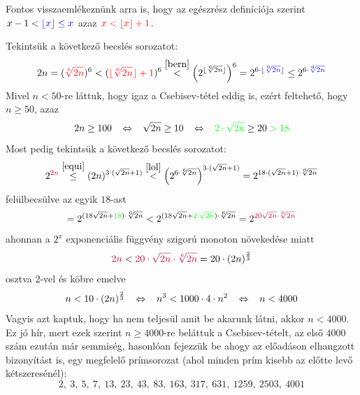 \documentclass[12pt]{book}
\theoremstyle{plain} %
\theoremstyle{definition} %
\theoremstyle{remark}
\numberwithin{equation}{section}  %
\begin{document}
	Fontos visszaemlékeznünk arra is, hogy az egészrész definíciója szerint $x - 1 < \color{blue} \lfloor x \rfloor \leq x \color{black}$ azaz $\color{red} x<\lfloor x \rfloor + 1 \color{black}$.
	
	Tekintsük a következő becslés sorozatot:
	\begin{equation}\label{lol}
		 2n = (\color{red}\sqrt[6]{2n}\color{black})^6 < (\color{red} \lfloor \sqrt[6]{2n} \rfloor + 1 \color{black})^6 \stackrel{\ref{bern}}{<} \left(2^{\lfloor \sqrt[6]{2n} \rfloor}\right)^6 = 2^{6\cdot \color{blue} \lfloor \sqrt[6]{2n} \rfloor \color{black} } \leq 2^{6\cdot \color{blue} \sqrt[6]{2n} \color{black} }
	\end{equation}
	Mivel $n< 50$-re láttuk, hogy igaz a Csebisev-tétel eddig is, ezért feltehető, hogy $n\geq 50$, azaz
	\[ 2n\geq 100 \hspace{3mm} \Leftrightarrow \hspace{3mm} \sqrt{2n} \geq 10 \hspace{3mm} \Leftrightarrow \hspace{3mm} \color{green}2\cdot \sqrt{2n}\color{black} \geq 20 \color{green}> 18\color{black}   \]
	Most pedig tekintsük a következő becslés sorozatot:
	\[ 2^{\color{purple}2n\color{black}} \stackrel{\ref{equi}}{\leq} (2n)^{3\cdot (\sqrt{2n} + 1)} \stackrel{\ref{lol}}{<} \left(2^{6\cdot \sqrt[6]{2n}}\right)^{3\cdot (\sqrt{2n}+1)} = 2^{18 \cdot (\sqrt{2n}+1)\cdot \sqrt[6]{2n}}  \]
	felülbecsülve az egyik $18$-ast
	\[= 2^{(18 \sqrt{2n}+\color{green}18\color{black})\cdot \sqrt[6]{2n}} <  2^{(18\sqrt{2n} + \color{green}2\cdot \sqrt{2n}\color{black})\cdot \sqrt[6]{2n}} = 2^{\color{purple}20\sqrt{2n}\cdot \sqrt[6]{2n}\color{black}}  \]
	ahonnan a $2^x$ exponenciális függvény szigorú monoton növekedése miatt
	\[ \color{purple} 2n \color{black} < \color{purple} 20\cdot \sqrt{2n} \cdot \sqrt[6]{2n} \color{black} = 20\cdot (2n)^{\frac{2}{3}} \]
	osztva $2$-vel és köbre emelve
	\[ n < 10\cdot (2n)^{\frac{2}{3}} \hspace{3mm} \Leftrightarrow \hspace{3mm} n^3 < 1000 \cdot 4 \cdot n^2 \hspace{3mm} \Leftrightarrow \hspace{3mm} n < 4000  \]
	Vagyis azt kaptuk, hogy ha nem teljesül amit be akarunk látni, akkor $n<4000$. Ez jó hír, mert ezek szerint $n\geq 4000$-re beláttuk a Csebisev-tételt, az első $4000$ szám ezután már semmiség, hasonlóan fejezzük be ahogy az előadáson elhangzott bizonyítást is, egy megfelelő prímsorozat (ahol minden prím kisebb az előtte levő kétszeresénél):
	\[ 2,\ 3,\ 5,\ 7,\ 13,\ 23,\ 43,\ 83,\ 163,\ 317,\ 631,\ 1259,\ 2503,\ 4001  \]
	

	

	
\end{document}
